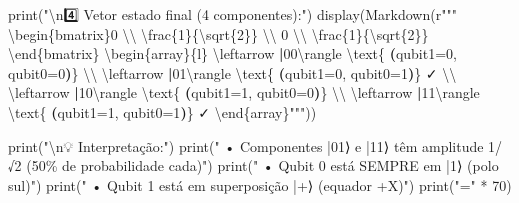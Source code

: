 \documentclass[
  brazilian,
]{report}
\newenvironment{Shaded}{\begin{snugshade}}{\end{snugshade}}
\newcommand{\BuiltInTok}[1]{\textcolor[rgb]{0.00,0.23,0.31}{#1}}
\newcommand{\CharTok}[1]{\textcolor[rgb]{0.13,0.47,0.30}{#1}}
\newcommand{\ControlFlowTok}[1]{\textcolor[rgb]{0.00,0.23,0.31}{\textbf{#1}}}
\newcommand{\DecValTok}[1]{\textcolor[rgb]{0.68,0.00,0.00}{#1}}
\newcommand{\ErrorTok}[1]{\textcolor[rgb]{0.68,0.00,0.00}{#1}}
\newcommand{\KeywordTok}[1]{\textcolor[rgb]{0.00,0.23,0.31}{\textbf{#1}}}
\newcommand{\NormalTok}[1]{\textcolor[rgb]{0.00,0.23,0.31}{#1}}
\newcommand{\OperatorTok}[1]{\textcolor[rgb]{0.37,0.37,0.37}{#1}}
\newcommand{\SpecialCharTok}[1]{\textcolor[rgb]{0.37,0.37,0.37}{#1}}
\newcommand{\StringTok}[1]{\textcolor[rgb]{0.13,0.47,0.30}{#1}}
\newcommand{\VerbatimStringTok}[1]{\textcolor[rgb]{0.13,0.47,0.30}{#1}}
\begin{document}
\begin{tcolorbox}
\begin{Shaded}
\begin{Highlighting}[]
\BuiltInTok{print}\NormalTok{(}\StringTok{"}\CharTok{\textbackslash{}n}\StringTok{4️⃣ Vetor estado final (4 componentes):"}\NormalTok{)}
\NormalTok{display(Markdown(}\VerbatimStringTok{r"""}\DecValTok{$$\textbackslash{}b}\VerbatimStringTok{egin\{bmatrix\}0 }\CharTok{\textbackslash{}\textbackslash{}}\VerbatimStringTok{ }\CharTok{\textbackslash{}f}\VerbatimStringTok{rac}\OperatorTok{\{1\}}\VerbatimStringTok{\{}\DecValTok{\textbackslash{}s}\VerbatimStringTok{qrt}\OperatorTok{\{2\}}\VerbatimStringTok{\} }\CharTok{\textbackslash{}\textbackslash{}}\VerbatimStringTok{ 0 }\CharTok{\textbackslash{}\textbackslash{}}\VerbatimStringTok{ }\CharTok{\textbackslash{}f}\VerbatimStringTok{rac}\OperatorTok{\{1\}}\VerbatimStringTok{\{}\DecValTok{\textbackslash{}s}\VerbatimStringTok{qrt}\OperatorTok{\{2\}}\VerbatimStringTok{\} }\ErrorTok{\textbackslash{}}\VerbatimStringTok{end\{bmatrix\} }\DecValTok{\textbackslash{}b}\VerbatimStringTok{egin\{array\}\{l\} }\ErrorTok{\textbackslash{}}\VerbatimStringTok{leftarrow }\ControlFlowTok{|}\VerbatimStringTok{00}\CharTok{\textbackslash{}r}\VerbatimStringTok{angle }\CharTok{\textbackslash{}t}\VerbatimStringTok{ext\{ }\KeywordTok{(}\VerbatimStringTok{qubit1=0, qubit0=0}\KeywordTok{)}\VerbatimStringTok{\} }\CharTok{\textbackslash{}\textbackslash{}}\VerbatimStringTok{ }\ErrorTok{\textbackslash{}}\VerbatimStringTok{leftarrow }\ControlFlowTok{|}\VerbatimStringTok{01}\CharTok{\textbackslash{}r}\VerbatimStringTok{angle }\CharTok{\textbackslash{}t}\VerbatimStringTok{ext\{ }\KeywordTok{(}\VerbatimStringTok{qubit1=0, qubit0=1}\KeywordTok{)}\VerbatimStringTok{\} ✓ }\CharTok{\textbackslash{}\textbackslash{}}\VerbatimStringTok{ }\ErrorTok{\textbackslash{}}\VerbatimStringTok{leftarrow }\ControlFlowTok{|}\VerbatimStringTok{10}\CharTok{\textbackslash{}r}\VerbatimStringTok{angle }\CharTok{\textbackslash{}t}\VerbatimStringTok{ext\{ }\KeywordTok{(}\VerbatimStringTok{qubit1=1, qubit0=0}\KeywordTok{)}\VerbatimStringTok{\} }\CharTok{\textbackslash{}\textbackslash{}}\VerbatimStringTok{ }\ErrorTok{\textbackslash{}}\VerbatimStringTok{leftarrow }\ControlFlowTok{|}\VerbatimStringTok{11}\CharTok{\textbackslash{}r}\VerbatimStringTok{angle }\CharTok{\textbackslash{}t}\VerbatimStringTok{ext\{ }\KeywordTok{(}\VerbatimStringTok{qubit1=1, qubit0=1}\KeywordTok{)}\VerbatimStringTok{\} ✓ }\ErrorTok{\textbackslash{}}\VerbatimStringTok{end\{array\}}\DecValTok{$$}\VerbatimStringTok{"""}\NormalTok{))}

\BuiltInTok{print}\NormalTok{(}\StringTok{"}\CharTok{\textbackslash{}n}\StringTok{💡 Interpretação:"}\NormalTok{)}
\BuiltInTok{print}\NormalTok{(}\StringTok{"   • Componentes |01⟩ e |11⟩ têm amplitude 1/√2 (50}\SpecialCharTok{\% d}\StringTok{e probabilidade cada)"}\NormalTok{)}
\BuiltInTok{print}\NormalTok{(}\StringTok{"   • Qubit 0 está SEMPRE em |1⟩ (polo sul)"}\NormalTok{)}
\BuiltInTok{print}\NormalTok{(}\StringTok{"   • Qubit 1 está em superposição |+⟩ (equador +X)"}\NormalTok{)}
\BuiltInTok{print}\NormalTok{(}\StringTok{"="} \OperatorTok{*} \DecValTok{70}\NormalTok{)}
\end{Highlighting}
\end{Shaded}

\end{tcolorbox}
\end{document}
